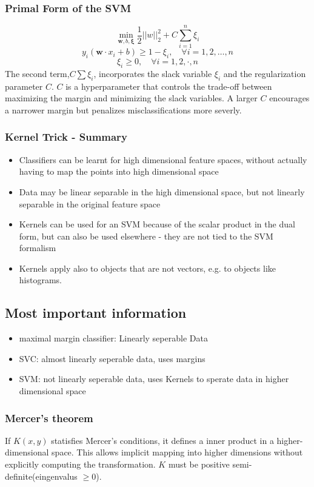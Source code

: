 \subsubsection{Primal Form of the SVM}
\[
\min_{\mathbf{w},b,\mathbf{\xi}}\frac{1}{2}||w||_2^2 + C \sum_{i = 1}^{n} \xi_i
\]
\[
y_i(\mathbf{w}\cdot x_i + b) \ge 1 - \xi_i, \quad \forall i = 1,2,\dots,n
\]
\[
\xi_i \ge 0, \quad \forall i = 1,2,\cdot,n
\]
The second term,\(C\sum \xi_i\), incorporates the slack variable \(\xi_i\) and the regularization parameter \(C\).
\(C\) is a hyperparameter that controls the trade-off between maximizing the margin and minimizing the slack variables.
A larger \(C\) encourages a narrower margin but penalizes misclassifications more severly.
\subsubsection{Kernel Trick - Summary}
\begin{itemize}
    \item Classifiers can be learnt for high dimensional feature spaces, without actually having to map the points into high dimensional space
    \item Data may be linear separable in the high dimensional space, but not linearly separable in the original feature space
    \item Kernels can be used for an SVM because of the scalar product in the dual form, but can also be used elsewhere - they are not tied to the SVM formalism
    \item Kernels apply also to objects that are not vectors, e.g. to objects like histograms.
\end{itemize}

\subsection{Most important information}
\begin{itemize}
    \item maximal margin classifier: Linearly seperable Data
    \item SVC: almost linearly seperable data, uses margins
    \item SVM: not linearly seperable data, uses Kernels to sperate data in higher dimensional space
\end{itemize}
\subsubsection*{Mercer's theorem}
If  \(K(x,y)\) statisfies Mercer's conditions, it defines a inner product in a higher-dimensional space.
This allows implicit mapping into higher dimensions without explicitly computing the transformation.
\(K\) must be positive semi-definite(eingenvalus \(\ge 0\)).

